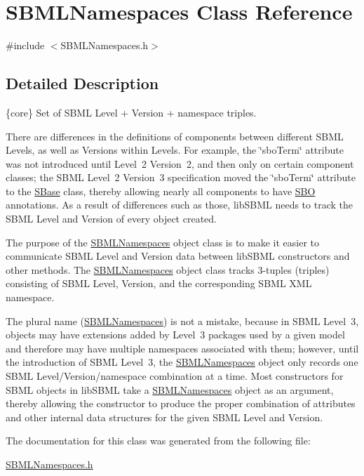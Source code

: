 \hypertarget{class_s_b_m_l_namespaces}{}\section{S\+B\+M\+L\+Namespaces Class Reference}
\label{class_s_b_m_l_namespaces}


{\ttfamily \#include $<$S\+B\+M\+L\+Namespaces.\+h$>$}



\subsection{Detailed Description}
\{core\} Set of S\+B\+ML Level + Version + namespace triples.



There are differences in the definitions of components between different S\+B\+ML Levels, as well as Versions within Levels. For example, the \char`\"{}sbo\+Term\char`\"{} attribute was not introduced until Level~2 Version~2, and then only on certain component classes; the S\+B\+ML Level~2 Version~3 specification moved the \char`\"{}sbo\+Term\char`\"{} attribute to the \hyperlink{class_s_base}{S\+Base} class, thereby allowing nearly all components to have \hyperlink{class_s_b_o}{S\+BO} annotations. As a result of differences such as those, lib\+S\+B\+ML needs to track the S\+B\+ML Level and Version of every object created.

The purpose of the \hyperlink{class_s_b_m_l_namespaces}{S\+B\+M\+L\+Namespaces} object class is to make it easier to communicate S\+B\+ML Level and Version data between lib\+S\+B\+ML constructors and other methods. The \hyperlink{class_s_b_m_l_namespaces}{S\+B\+M\+L\+Namespaces} object class tracks 3-\/tuples (triples) consisting of S\+B\+ML Level, Version, and the corresponding S\+B\+ML X\+ML namespace.

The plural name (\hyperlink{class_s_b_m_l_namespaces}{S\+B\+M\+L\+Namespaces}) is not a mistake, because in S\+B\+ML Level~3, objects may have extensions added by Level~3 packages used by a given model and therefore may have multiple namespaces associated with them; however, until the introduction of S\+B\+ML Level~3, the \hyperlink{class_s_b_m_l_namespaces}{S\+B\+M\+L\+Namespaces} object only records one S\+B\+ML Level/\+Version/namespace combination at a time. Most constructors for S\+B\+ML objects in lib\+S\+B\+ML take a \hyperlink{class_s_b_m_l_namespaces}{S\+B\+M\+L\+Namespaces} object as an argument, thereby allowing the constructor to produce the proper combination of attributes and other internal data structures for the given S\+B\+ML Level and Version. 

The documentation for this class was generated from the following file\+:\begin{DoxyCompactItemize}
\item 
\hyperlink{_s_b_m_l_namespaces_8h}{S\+B\+M\+L\+Namespaces.\+h}\end{DoxyCompactItemize}
